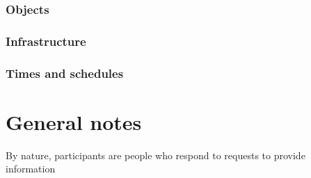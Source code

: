 \subsubsection{Objects}\label{sec:resobjects}
\subsubsection{Infrastructure}\label{sec:resinfrastructure}
\subsubsection{Times and schedules}\label{sec:restimes}

\section{General notes}
By nature, participants are people who respond to requests to provide information


%
